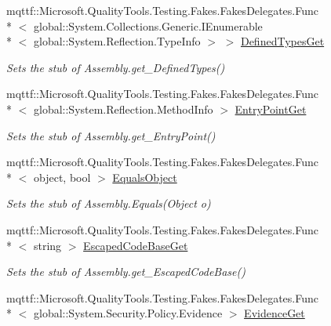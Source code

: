 \begin{DoxyCompactItemize}
mqttf\-::\-Microsoft.\-Quality\-Tools.\-Testing.\-Fakes.\-Fakes\-Delegates.\-Func\\*
$<$ global\-::\-System.\-Collections.\-Generic.\-I\-Enumerable\\*
$<$ global\-::\-System.\-Reflection.\-Type\-Info $>$ $>$ \hyperlink{class_system_1_1_reflection_1_1_fakes_1_1_stub_assembly_aee0646e0a1f3715bab73aabf364ab5e8}{Defined\-Types\-Get}
\begin{DoxyCompactList}\small\item\em Sets the stub of Assembly.\-get\-\_\-\-Defined\-Types()\end{DoxyCompactList}\item 
mqttf\-::\-Microsoft.\-Quality\-Tools.\-Testing.\-Fakes.\-Fakes\-Delegates.\-Func\\*
$<$ global\-::\-System.\-Reflection.\-Method\-Info $>$ \hyperlink{class_system_1_1_reflection_1_1_fakes_1_1_stub_assembly_ad7279a7c15efb00a475fde3fd09a36cd}{Entry\-Point\-Get}
\begin{DoxyCompactList}\small\item\em Sets the stub of Assembly.\-get\-\_\-\-Entry\-Point()\end{DoxyCompactList}\item 
mqttf\-::\-Microsoft.\-Quality\-Tools.\-Testing.\-Fakes.\-Fakes\-Delegates.\-Func\\*
$<$ object, bool $>$ \hyperlink{class_system_1_1_reflection_1_1_fakes_1_1_stub_assembly_a856ccf88b4e43c0417e32c58994fdc6a}{Equals\-Object}
\begin{DoxyCompactList}\small\item\em Sets the stub of Assembly.\-Equals(\-Object o)\end{DoxyCompactList}\item 
mqttf\-::\-Microsoft.\-Quality\-Tools.\-Testing.\-Fakes.\-Fakes\-Delegates.\-Func\\*
$<$ string $>$ \hyperlink{class_system_1_1_reflection_1_1_fakes_1_1_stub_assembly_a5d07087a773b29c8bf8d8905d6c83ecd}{Escaped\-Code\-Base\-Get}
\begin{DoxyCompactList}\small\item\em Sets the stub of Assembly.\-get\-\_\-\-Escaped\-Code\-Base()\end{DoxyCompactList}\item 
mqttf\-::\-Microsoft.\-Quality\-Tools.\-Testing.\-Fakes.\-Fakes\-Delegates.\-Func\\*
$<$ global\-::\-System.\-Security.\-Policy.\-Evidence $>$ \hyperlink{class_system_1_1_reflection_1_1_fakes_1_1_stub_assembly_adf28e2437c1f3e6b00f4305d84d69644}{Evidence\-Get}

\end{DoxyCompactItemize}
